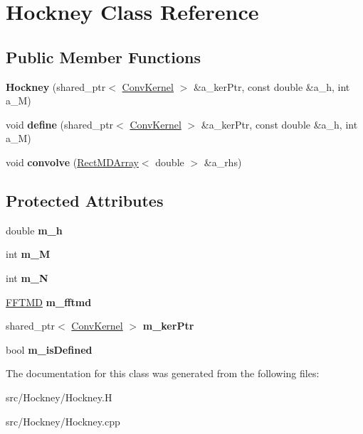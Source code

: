 \hypertarget{class_hockney}{}\section{Hockney Class Reference}
\label{class_hockney}
\subsection*{Public Member Functions}
\begin{DoxyCompactItemize}
\item 
\mbox{\label{class_hockney_a6f65a0f28be1522faa7dbe8edbefb1ab}} 
{\bfseries Hockney} (shared\+\_\+ptr$<$ \hyperlink{class_conv_kernel}{Conv\+Kernel} $>$ \&a\+\_\+ker\+Ptr, const double \&a\+\_\+h, int a\+\_\+M)
\item 
\mbox{\label{class_hockney_a845942d3dc47756860aff77afb89499f}} 
void {\bfseries define} (shared\+\_\+ptr$<$ \hyperlink{class_conv_kernel}{Conv\+Kernel} $>$ \&a\+\_\+ker\+Ptr, const double \&a\+\_\+h, int a\+\_\+M)
\item 
\mbox{\label{class_hockney_a42de9a1d8871a7d082985633718c9683}} 
void {\bfseries convolve} (\hyperlink{class_rect_m_d_array}{Rect\+M\+D\+Array}$<$ double $>$ \&a\+\_\+rhs)
\end{DoxyCompactItemize}
\subsection*{Protected Attributes}
\begin{DoxyCompactItemize}
\item 
\mbox{\label{class_hockney_a117b101e4d0e7c21be97b54567ce025d}} 
double {\bfseries m\+\_\+h}
\item 
\mbox{\label{class_hockney_a285ed890fe7fa49e984359cb7d608633}} 
int {\bfseries m\+\_\+M}
\item 
\mbox{\label{class_hockney_a457e33c833c6624297875c1ff1991f31}} 
int {\bfseries m\+\_\+N}
\item 
\mbox{\label{class_hockney_a94cc01535b5865bdac9a1355aba65bb4}} 
\hyperlink{class_f_f_t_m_d}{F\+F\+T\+MD} {\bfseries m\+\_\+fftmd}
\item 
\mbox{\label{class_hockney_abfd66c7ddccd95686f9d7394d37df3b7}} 
shared\+\_\+ptr$<$ \hyperlink{class_conv_kernel}{Conv\+Kernel} $>$ {\bfseries m\+\_\+ker\+Ptr}
\item 
\mbox{\label{class_hockney_a90187a035100a4ad48d43e53dc6e169f}} 
bool {\bfseries m\+\_\+is\+Defined}
\end{DoxyCompactItemize}


The documentation for this class was generated from the following files\+:\begin{DoxyCompactItemize}
\item 
src/\+Hockney/Hockney.\+H\item 
src/\+Hockney/Hockney.\+cpp\end{DoxyCompactItemize}
